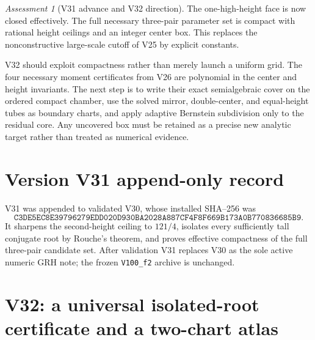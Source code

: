 \documentclass[11pt]{article}
\theoremstyle{definition}
\theoremstyle{remark}
\newtheorem{assessment}[theorem]{Assessment}
\begin{document}
\begin{assessment}[V31 advance and V32 direction]
\label{ass:f2v31}
The one-high-height face is now closed effectively.  The full necessary
three-pair parameter set is compact with rational height ceilings and an
integer center box.  This replaces the nonconstructive large-scale cutoff
of V25 by explicit constants.

V32 should exploit compactness rather than merely launch a uniform grid.
The four necessary moment certificates from V26 are polynomial in the
center and height invariants.  The next step is to write their exact
semialgebraic cover on the ordered compact chamber, use the solved mirror,
double-center, and equal-height tubes as boundary charts, and apply adaptive
Bernstein subdivision only to the residual core.  Any uncovered box must be
retained as a precise new analytic target rather than treated as numerical
evidence.
\end{assessment}

\section*{Version V31 append-only record}

V31 was appended to validated V30, whose installed SHA--256 was
\[
 \texttt{C3DE5EC8E39796279EDD020D930BA2028A887CF4F8F669B173A0B770836685B9}.
 \tag{N31.23}
\]
It sharpens the second-height ceiling to \(121/4\), isolates every
sufficiently tall conjugate root by Rouche's theorem, and proves effective
compactness of the full three-pair candidate set.  After validation V31
replaces V30 as the sole active numeric GRH note; the frozen
\texttt{V100\_f2} archive is unchanged.




\section{V32: a universal isolated-root certificate and a two-chart atlas}
\label{sec:f2v32-isolated-root}
\end{document}
